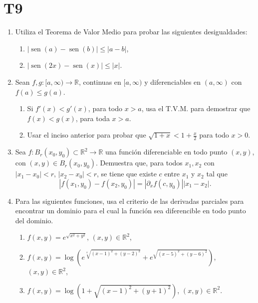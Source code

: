 \documentclass{article}
\theoremstyle{definition}
\newcommand{\sen}{\operatorname{sen}}
\begin{document}
  \section*{T9 }


  \begin{enumerate}



  \item\label{Ejer:DesigualdadesAplicandoTVM}
    Utiliza el Teorema de Valor Medio para probar las siguientes desigualdades:
\begin{enumerate}
\item $|\sen(a)-\sen(b)| \leq |a-b|$,
\item $|\sen(2x)-\sen(x)| \leq |x|$.
\end{enumerate}


\item Sean $f,g:[a,\infty)\to \mathbb{R}$, continuas en $[a,\infty)$ y diferenciables en $(a,\infty)$ con
$f(a) \leq g(a)$.

\begin{enumerate}
\item Si $f'(x) < g'(x)$, para todo $x>a$, usa el T.V.M. para demostrar que $f(x) < g(x)$, para toda $x>a$.
\item Usar el inciso anterior para probar que $\sqrt{1+x}< 1+\frac{x}{2}$ para todo $x>0$.
\end{enumerate}    
  
\item Sea $f:B_r(x_0,y_0)\subset \mathbb{R}^2 \to \mathbb{R}$ una funci\'on diferenciable en todo
  punto $(x,y)$, con $(x,y)\in B_r(x_0,y_0)$. Demuestra que, para todos $x_1,x_2$ con $|x_1-x_0|<r$,
  $|x_2-x_0|<r$, se tiene que existe $c$ entre $x_1$ y $x_2$ tal que
  $$
  |f(x_1,y_0)-f(x_2,y_0)| = |\partial_xf(c,y_0)||x_1-x_2|.
  $$

  \item Para las siguientes funciones, usa el criterio
    de las derivadas parciales para encontrar  un dominio
    para el cual la funci\'on sea diferencible en
    todo punto del dominio.
    \begin{enumerate}
    \item $f(x,y)=e^{\sqrt{x^2+y^2}}$,  $(x,y)\in \mathbb{R}^2$,
    \item $f(x,y)=\log(e^{\sqrt[4]{(x-1)^2+(y-2)^2}}+e^{\sqrt{(x-5)^2+(y-6)^2}})$,
      $(x,y)\in \mathbb{R}^2$,
      \item $f(x,y)=\log(1+\sqrt{(x-1)^2+(y+1)^2})$, $(x,y)\in \mathbb{R}^2$.
    \end{enumerate}
    



\end{enumerate}
\end{document}
